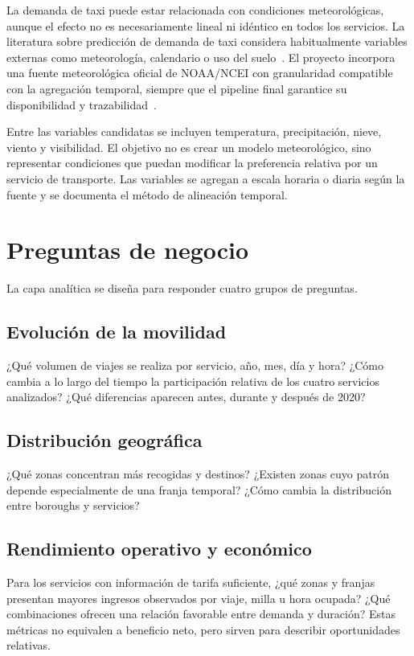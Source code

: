 La demanda de taxi puede estar relacionada con condiciones meteorológicas, aunque el efecto no es necesariamente lineal ni idéntico en todos los servicios. La literatura sobre predicción de demanda de taxi considera habitualmente variables externas como meteorología, calendario o uso del suelo~\cite{safikhani2020,hybridtaxi2024}. El proyecto incorpora una fuente meteorológica oficial de NOAA/NCEI con granularidad compatible con la agregación temporal, siempre que el pipeline final garantice su disponibilidad y trazabilidad~\cite{noaa_ncei}.

Entre las variables candidatas se incluyen temperatura, precipitación, nieve, viento y visibilidad. El objetivo no es crear un modelo meteorológico, sino representar condiciones que puedan modificar la preferencia relativa por un servicio de transporte. Las variables se agregan a escala horaria o diaria según la fuente y se documenta el método de alineación temporal.

\section{Preguntas de negocio}

La capa analítica se diseña para responder cuatro grupos de preguntas.

\subsection{Evolución de la movilidad}

¿Qué volumen de viajes se realiza por servicio, año, mes, día y hora? ¿Cómo cambia a lo largo del tiempo la participación relativa de los cuatro servicios analizados? ¿Qué diferencias aparecen antes, durante y después de 2020?

\subsection{Distribución geográfica}

¿Qué zonas concentran más recogidas y destinos? ¿Existen zonas cuyo patrón depende especialmente de una franja temporal? ¿Cómo cambia la distribución entre boroughs y servicios?

\subsection{Rendimiento operativo y económico}

Para los servicios con información de tarifa suficiente, ¿qué zonas y franjas presentan mayores ingresos observados por viaje, milla u hora ocupada? ¿Qué combinaciones ofrecen una relación favorable entre demanda y duración? Estas métricas no equivalen a beneficio neto, pero sirven para describir oportunidades relativas.

